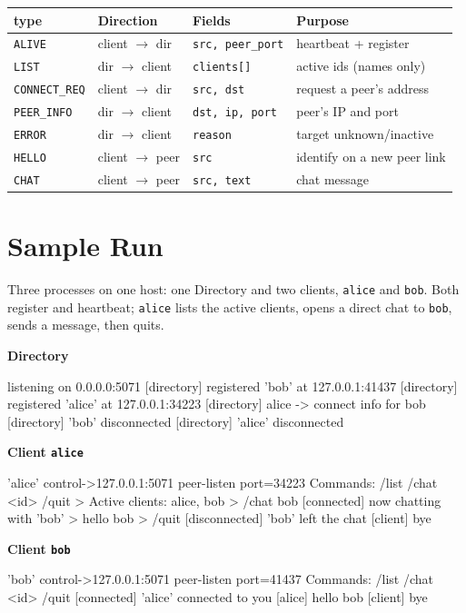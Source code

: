 \documentclass[11pt]{article}
\begin{document}
\begin{center}
\begin{tabular}{@{}llll@{}}
\toprule
\textbf{type} & \textbf{Direction} & \textbf{Fields} & \textbf{Purpose} \\
\midrule
\texttt{ALIVE}       & client $\to$ dir  & \texttt{src, peer\_port}     & heartbeat + register \\
\texttt{LIST}        & dir $\to$ client  & \texttt{clients[]}           & active ids (names only) \\
\texttt{CONNECT\_REQ}& client $\to$ dir  & \texttt{src, dst}            & request a peer's address \\
\texttt{PEER\_INFO}  & dir $\to$ client  & \texttt{dst, ip, port}       & peer's IP and port \\
\texttt{ERROR}       & dir $\to$ client  & \texttt{reason}              & target unknown/inactive \\
\texttt{HELLO}       & client $\to$ peer & \texttt{src}                 & identify on a new peer link \\
\texttt{CHAT}        & client $\to$ peer & \texttt{src, text}           & chat message \\
\bottomrule
\end{tabular}
\end{center}

\section{Sample Run}
Three processes on one host: one Directory and two clients, \texttt{alice} and
\texttt{bob}. Both register and heartbeat; \texttt{alice} lists the active
clients, opens a direct chat to \texttt{bob}, sends a message, then quits.

\noindent\textbf{Directory}
\begin{trans}
[directory] listening on 0.0.0.0:5071
[directory] registered 'bob' at 127.0.0.1:41437
[directory] registered 'alice' at 127.0.0.1:34223
[directory] alice -> connect info for bob
[directory] 'bob' disconnected
[directory] 'alice' disconnected
\end{trans}

\noindent\textbf{Client \texttt{alice}}
\begin{trans}
[client] 'alice' control->127.0.0.1:5071  peer-listen port=34223
Commands: /list  /chat <id>  /quit
> Active clients: alice, bob
> /chat bob
[connected] now chatting with 'bob'
> hello bob
> /quit
[disconnected] 'bob' left the chat
[client] bye
\end{trans}

\noindent\textbf{Client \texttt{bob}}
\begin{trans}
[client] 'bob' control->127.0.0.1:5071  peer-listen port=41437
Commands: /list  /chat <id>  /quit
[connected] 'alice' connected to you
[alice] hello bob
[client] bye
\end{trans}
\end{document}
